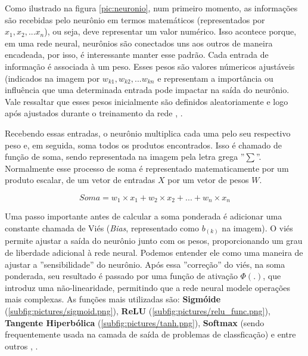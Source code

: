 Como ilustrado na figura \ref{pic:neuronio}, num primeiro momento, as informações são recebidas pelo neurônio em termos matemáticos (representados por $x_1, x_2, ... x_n$), ou seja, deve representar um valor numérico. Isso acontece porque, em uma rede neural, neurônios são conectados uns aos outros de maneira encadeada, por isso, é interessante manter esse padrão. Cada entrada de informação é associada à um peso. Esses pesos são valores númericos ajustáveis (indicados na imagem por $w_{k1}, w_{k2}, ...w_{kn}$ e representam a importância ou influência que uma determinada entrada pode impactar na saída do neurônio. Vale ressaltar que esses pesos inicialmente são definidos aleatoriamente e logo após ajustados durante o treinamento da rede \cite{GoodfellowBengioCourville2016}, \cite{Watt2016MachineLearning}.

\newpage

Recebendo essas entradas, o neurônio multiplica cada uma pelo seu respectivo peso e, em seguida, soma todos os produtos encontrados. Isso é chamado de função de soma, sendo representada na imagem pela letra grega ''$\sum$''. Normalmente esse processo de soma é representado matematicamente por um produto escalar, de um vetor de entradas $X$ por um vetor de pesos $W$.

$$
Soma = w_1 \times x_1 + w_2 \times x_2 + ... + w_n \times x_n
$$

Uma passo importante antes de calcular a soma ponderada é adicionar uma constante chamada de Viés (\textit{Bias}, representado como $b_{(k)}$ na imagem). O viés permite ajustar a saída do neurônio junto com os pesos, proporcionando um grau de liberdade adicional à rede neural. Podemos entender ele como uma maneira de ajustar a ''sensibilidade'' do neurônio. Após essa ''correção'' do viés, na soma ponderada, seu resultado é passado por uma função de ativação $\Phi(.)$, que introduz uma não-linearidade, permitindo que a rede neural modele operações mais complexas. As funções mais utilizadas são: \textbf{Sigmóide} (\ref{subfig:pictures/sigmoid.png}), \textbf{ReLU} (\ref{subfig:pictures/relu_func.png}), \textbf{Tangente Hiperbólica} (\ref{subfig:pictures/tanh.png}), \textbf{Softmax} (sendo frequentemente usada na camada de saída de problemas de classficação) e entre outros \cite{GoodfellowBengioCourville2016}, \cite{Watt2016MachineLearning}. 


{
 \\
}


